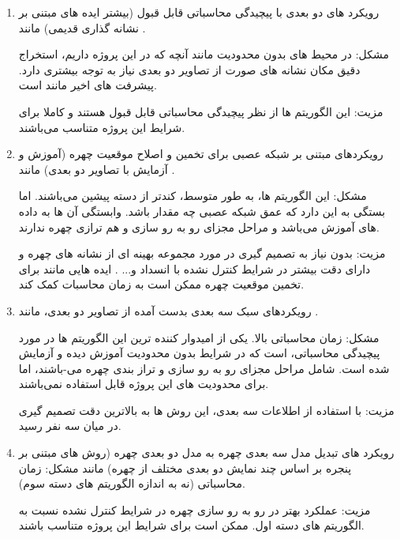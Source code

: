 \begin{enumerate}
\item
رویکرد های دو بعدی با پیچیدگی محاسباتی قابل قبول (بیشتر ایده های مبتنی بر نشانه گذاری  قدیمی) مانند 
\cite{HAGHIGHAT201623, LV2016465, amos2016openface, 6196234}.

\noindent
مشکل: در محیط های بدون محدودیت مانند آنچه که در این پروژه داریم، استخراج دقیق مکان نشانه های صورت از تصاویر دو بعدی نیاز به توجه بیشتری دارد. پیشرفت های اخیر مانند \cite{HAGHIGHAT201623} است.

\noindent
مزیت: این الگوریتم ها از نظر پیچیدگی محاسباتی  قابل قبول هستند و کاملا برای شرایط این پروژه متناسب می‌باشند.
\item 
رویکردهای مبتنی بر شبکه عصبی برای تخمین و اصلاح موقعیت چهره (آموزش و آزمایش با تصاویر دو بعدی) مانند 
\cite{wu2016facial, 7477555, 7780892, 7532959, 7298667}.

\noindent
مشکل: این الگوریتم ها، به طور متوسط، کندتر از دسته پیشین می‌باشند. اما بستگی به این دارد که عمق شبکه عصبی چه مقدار باشد. وابستگی آن ها به داده های آموزش می‌باشد و مراحل مجزای رو به رو سازی و هم ترازی چهره ندارند.

\noindent
مزیت: بدون نیاز به تصمیم گیری در مورد مجموعه بهینه ای از نشانه های چهره و دارای دقت بیشتر در شرایط کنترل نشده با انسداد و... . ایده هایی مانند \cite{Martino2015} برای تخمین موقعیت چهره ممکن است به زمان محاسبات کمک کند.
\item

رویکردهای سبک سه بعدی بدست آمده از تصاویر دو بعدی، مانند 
\cite{HU2017366, hassner2014effective, 7298679, 7006757, 6905796}.

\noindent
مشکل: زمان محاسباتی بالا. یکی از امیدوار کننده ترین این الگوریتم ها در مورد پیچیدگی محاسباتی، \cite{hassner2014effective} است که در شرایط بدون محدودیت آموزش دیده و آزمایش شده است. شامل مراحل مجزای رو به رو سازی و تراز بندی چهره می-باشند، اما برای محدودیت های این پروژه قابل استفاده نمی‌باشند.

\noindent
مزیت: با استفاده از اطلاعات سه بعدی، این روش ها به بالاترین دقت تصمیم گیری در میان سه نفر رسید.
\item
رویکرد های تبدیل مدل سه بعدی چهره به مدل دو بعدی چهره (روش های مبتنی بر پنجره  بر اساس چند نمایش دو بعدی مختلف از چهره) مانند \cite{DING2017144}
\noindent
مشکل: زمان محاسباتی (نه به اندازه الگوریتم های دسته سوم). 

\noindent
مزیت: عملکرد بهتر در رو به رو سازی چهره در شرایط کنترل نشده نسبت به الگوریتم های دسته اول. ممکن است برای شرایط این پروژه متناسب باشند.
\end{enumerate}

